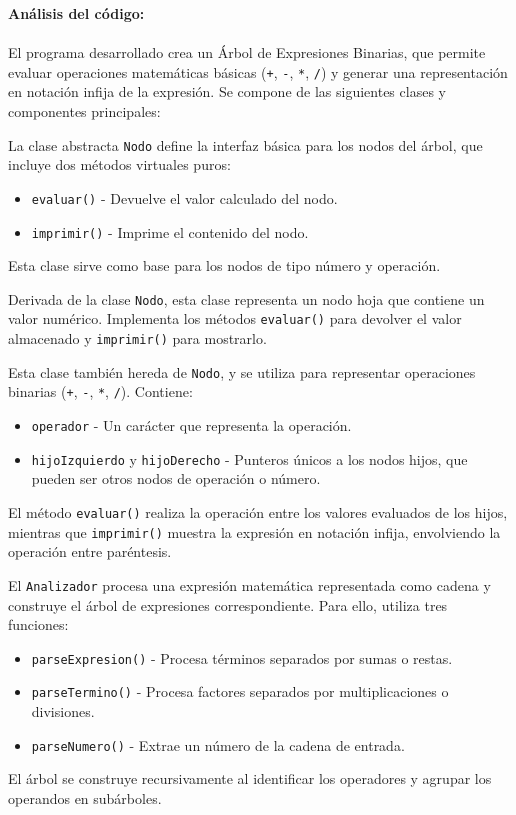 \documentclass{article}
\begin{document}
        \textbf{Análisis del código:}  \\\\
        El programa desarrollado crea un Árbol de Expresiones Binarias, que permite evaluar operaciones matemáticas básicas (\texttt{+}, \texttt{-}, \texttt{*}, \texttt{/}) y generar una representación en notación infija de la expresión. Se compone de las siguientes clases y componentes principales:
        
        La clase abstracta \texttt{Nodo} define la interfaz básica para los nodos del árbol, que incluye dos métodos virtuales puros:
        \begin{itemize}
            \item \texttt{evaluar()} - Devuelve el valor calculado del nodo.
            \item \texttt{imprimir()} - Imprime el contenido del nodo.
        \end{itemize}
        Esta clase sirve como base para los nodos de tipo número y operación.
        
        Derivada de la clase \texttt{Nodo}, esta clase representa un nodo hoja que contiene un valor numérico. Implementa los métodos \texttt{evaluar()} para devolver el valor almacenado y \texttt{imprimir()} para mostrarlo.
        
        Esta clase también hereda de \texttt{Nodo}, y se utiliza para representar operaciones binarias (\texttt{+}, \texttt{-}, \texttt{*}, \texttt{/}). Contiene:
        \begin{itemize}
            \item \texttt{operador} - Un carácter que representa la operación.
            \item \texttt{hijoIzquierdo} y \texttt{hijoDerecho} - Punteros únicos a los nodos hijos, que pueden ser otros nodos de operación o número.
        \end{itemize}
        El método \texttt{evaluar()} realiza la operación entre los valores evaluados de los hijos, mientras que \texttt{imprimir()} muestra la expresión en notación infija, envolviendo la operación entre paréntesis.
        
        El \texttt{Analizador} procesa una expresión matemática representada como cadena y construye el árbol de expresiones correspondiente. Para ello, utiliza tres funciones:
        \begin{itemize}
            \item \texttt{parseExpresion()} - Procesa términos separados por sumas o restas.
            \item \texttt{parseTermino()} - Procesa factores separados por multiplicaciones o divisiones.
            \item \texttt{parseNumero()} - Extrae un número de la cadena de entrada.
        \end{itemize}
        El árbol se construye recursivamente al identificar los operadores y agrupar los operandos en subárboles.
        
\end{document}
